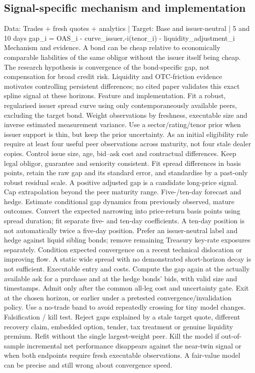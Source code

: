 \documentclass[10pt]{article}
\begin{document}
\subsection{Signal-specific mechanism and implementation}
Data: Trades + fresh quotes + analytics  |  Target: Base and issuer-neutral  |  5 and 10 days gap\_i = OAS\_i - curve\_issuer,-i(tenor\_i) - liquidity\_adjustment\_i Mechanism and evidence.  A bond can be cheap relative to economically comparable liabilities of the same obligor without the issuer itself being cheap. The research hypothesis is convergence of the bond-specific gap, not compensation for broad credit risk. Liquidity and OTC-friction evidence motivates controlling persistent differences; no cited paper validates this exact spline signal at these horizons. Feature and implementation.  Fit a robust, regularised issuer spread curve using only contemporaneously available peers, excluding the target bond. Weight observations by freshness, executable size and inverse estimated measurement variance. Use a sector/rating/tenor prior when issuer support is thin, but keep the prior uncertainty. As an initial eligibility rule require at least four useful peer observations across maturity, not four stale dealer copies. Control issue size, age, bid--ask cost and contractual differences. Keep legal obligor, guarantee and seniority consistent. Fit spread differences in basis points, retain the raw gap and its standard error, and standardise by a past-only robust residual scale. A positive adjusted gap is a candidate long-price signal. Cap extrapolation beyond the peer maturity range. Five-/ten-day forecast and hedge.  Estimate conditional gap dynamics from previously observed, mature outcomes. Convert the expected narrowing into price-return basis points using spread duration; fit separate five- and ten-day coefficients. A ten-day position is not automatically twice a five-day position. Prefer an issuer-neutral label and hedge against liquid sibling bonds; remove remaining Treasury key-rate exposures separately. Condition expected convergence on a recent technical dislocation or improving flow. A static wide spread with no demonstrated short-horizon decay is not sufficient. Executable entry and costs.  Compute the gap again at the actually available ask for a purchase and at the hedge bonds’ bids, with valid size and timestamps. Admit only after the common all-leg cost and uncertainty gate. Exit at the chosen horizon, or earlier under a pretested convergence/invalidation policy. Use a no-trade band to avoid repeatedly crossing for tiny model changes. Falsification / kill test.  Reject gaps explained by a stale target quote, different recovery claim, embedded option, tender, tax treatment or genuine liquidity premium. Refit without the single largest-weight peer. Kill the model if out-of-sample incremental net performance disappears against the near-twin signal or when both endpoints require fresh executable observations. A fair-value model can be precise and still wrong about convergence speed.
\end{document}
